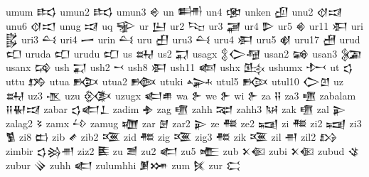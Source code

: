  umum  𒌣   
 umun2  𒌣   
 umun3  𒄴   
 un  𒌦   
 un4  𒂬   
 unken  𒌺   
 unu2  𒋼𒀕    
 unu6  𒋼𒀊    
 unug  𒀕   
 uq  𒊌   
 ur  𒌨   
 ur2  𒌫   
 ur3  𒃡   
 ur4  𒌴   
 ur5  𒄯   
 ur11  𒀳   
 uri  𒌵   
 uri3  𒌶   
 uri4  𒅂   
 urin  𒌶   
 uru  𒌷   
 uru3  𒌶   
 uru4  𒀳   
 uru5  𒋽   
 uru17  𒍇   
 urud  𒍏   
 uruda  𒍏   
 urudu  𒍏   
 us  𒊻   
 us2  𒍑   
 usagx  𒉭𒀖𒆷        
 usan2  𒄝   
 usan3  𒉮   
 usanx  𒄙   
 ush  𒍑   
 ush2  𒍗   
 ush8  𒀳   
 ush11  𒅜   
 ushx  𒍖   
 ushumx  𒍘   
 ut  𒌓   
 uttu  𒋸   
 utua  𒁭   
 utua2  𒁦   
 utuki  𒍙   
 utul5  𒁟   
 utul10  𒀖𒇻    
 uz  𒊻   
 uz3  𒍚   
 uzu  𒍜   
 uzugx  𒅗𒌑    
 wa  𒉿   
 we  𒉿   
 wi  𒉿   
 za  𒍝   
 za3  𒍠   
 zabalam  𒍝𒈽𒀕    
 zabar  𒌓𒅗𒁇    
 zadim  𒈯   
 zag  𒍠   
 zahh  𒉈   
 zahh3  𒀄   
 zak  𒍠   
 zal  𒉌   
 zalag2  𒂟   
 zamx  𒍡   
 zamug  𒁾   
 zar  𒇡   
 zar2  𒉌   
 ze  𒍣   
 ze2  𒍢   
 zi  𒍣   
 zi2  𒍢   
 zi3  𒍥   
 zi8  𒆗   
 zib  𒍦   
 zib2  𒍨   
 zid  𒍣   
 zig  𒍨   
 zig3  𒍣   
 zik  𒍨   
 zil  𒉣   
 zil2  𒋳   
 zimbir  𒌓𒄒𒉣    
 ziz2  𒍩   
 zu  𒍪   
 zu2  𒅗   
 zu5  𒍫   
 zub  𒉽𒈿    
 zubi  𒉽𒈿    
 zubud  𒄪   
 zubur  𒍭   
 zuhh  𒅗   
 zulumhhi  𒋠𒋤    
 zum  𒍮   
 zur  𒀫   
